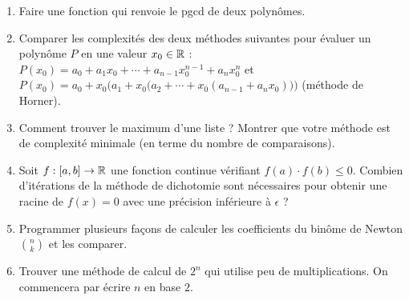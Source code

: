 \documentclass[class=report,crop=false]{standalone}
\begin{document}
\begin{miniexercices}
\begin{enumerate}
  \item Faire une fonction qui renvoie le pgcd de deux polynômes.

  \item Comparer les complexités des deux méthodes suivantes pour évaluer un polynôme $P$ en une valeur $x_0 \in \mathbb{R}$ :
  $P(x_0)= a_0+a_1x_0+\cdots+a_{n-1}x_0^{n-1}+a_nx_0^n$ et $P(x_0)=a_0+x_0\bigg(a_1 + x_0\big(a_2+ \cdots + x_0(a_{n-1}+a_nx_0)\big)\bigg)$
  (méthode de Horner).

  \item Comment trouver le maximum d'une liste ? Montrer que votre méthode est de complexité minimale
 (en terme du nombre de comparaisons).

  \item Soit $f : [a,b] \to \mathbb{R}$ une fonction continue vérifiant $f(a)\cdot f(b)\le 0$. Combien d'itérations de la méthode de dichotomie
  sont nécessaires pour obtenir une racine de $f(x)=0$ avec une précision inférieure à $\epsilon$ ?

  \item Programmer plusieurs façons de calculer les coefficients du binôme de Newton $\binom{n}{k}$ et les comparer.

  \item Trouver une méthode de calcul de $2^n$ qui utilise peu de multiplications. On commencera par écrire $n$ en base $2$.
\end{enumerate}
\end{miniexercices}


\finchapitre
\end{document}
